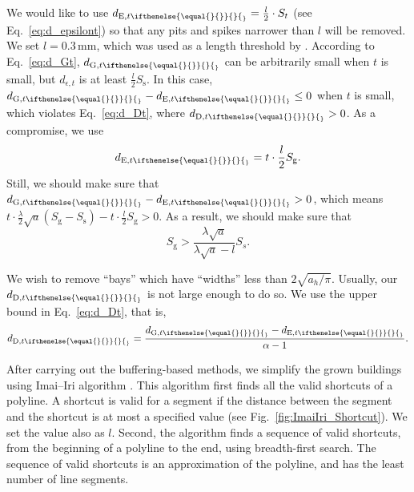 \documentclass[graybox]{svmult}
\newcommand{\fig}{Fig.~}
\newcommand{\eq}{Eq.~}
\newcommand{\dtrm}[2][]{d_{\mathrm{#2}, t\ifthenelse{\equal{#1}{}}{}{_#1}}}
\begin{document}
We would like to use $\dtrm{E}=\frac{l}{2} \cdot S_t$
(see \eq\ref{eq:d_epsilont}) so that
any pits and spikes narrower than $l$ will be removed. 
We set $l=0.3\,\mathrm{mm}$, which was used as a length threshold by 
\textcite{Regnauld2001,Li2004,Basaraner2008}.
According to \eq\ref{eq:d_Gt}, $\dtrm{G}$ can be arbitrarily small 
when $t$ is small, 
but $d_{\epsilon, t}$ is at least $\frac{l}{2} S_\mathrm{s}$. 
In this case, $\dtrm{G}-\dtrm{E} \le 0$ when $t$ is small, 
which violates \eq\ref{eq:d_Dt}, where $\dtrm{D}>0$.
As a compromise, we use
\begin{equation}
\label{eq:d_Et}
\dtrm{E} =t \cdot \frac{l}{2} S_\mathrm{g}.
\end{equation}
Still, we should make sure that $\dtrm{G}-\dtrm{E} > 0$, which means
$t \cdot \frac{\lambda}{2}\sqrt{a} (S_\mathrm{g}-S_\mathrm{s})-
t \cdot \frac{l}{2} S_\mathrm{g} >0$.
As a result, we should make sure that
\begin{equation}
\label{eq:S_g}
S_\mathrm{g} > \frac{\lambda\sqrt{a}}{\lambda\sqrt{a}-l} S_s.
\end{equation}

We wish to remove ``bays'' which have ``widths'' less than $2\sqrt{a_h/\pi}$.
Usually, our $\dtrm{D}$ is not large enough to do so.
We use the upper bound in \eq\ref{eq:d_Dt}, that is,
\[
\dtrm{D} = \frac{\dtrm{G}-\dtrm{E}}{\alpha - 1}.
\]

After carrying out the buffering-based methods, 
we simplify the grown buildings using Imai--Iri algorithm 
\parencite{ImaiIri1988}.
This algorithm first finds all the valid shortcuts of a polyline.
A shortcut is valid for a segment 
if the distance between the segment and the shortcut is at most a specified 
value
(see \fig\ref{fig:ImaiIri_Shortcut}).
We set the value also as $l$. 
Second, the algorithm finds a sequence of valid shortcuts, from the beginning 
of a polyline to the end, using breadth-first search.
The sequence of valid shortcuts is an approximation of the polyline, 
and has the least number of line segments.
\end{document}
